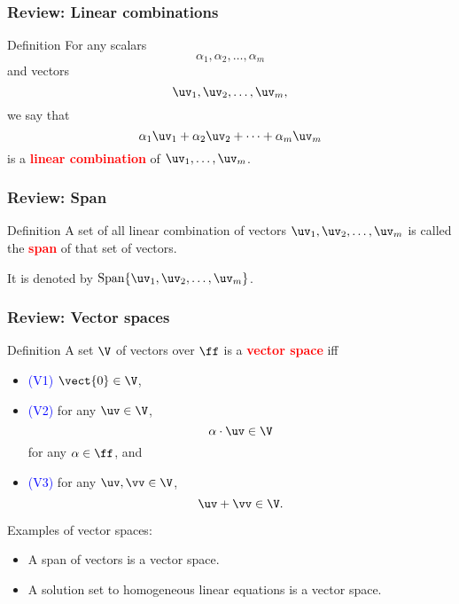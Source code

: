 

\begin{frame}
  \frametitle{Review: Linear combinations}

  \begin{block}{Definition}
    For any scalars
    \[
    \alpha_1,\alpha_2,\ldots,\alpha_m
    \]
    and vectors
    \[
    \uv_1,\uv_2,\ldots,\uv_m,
    \]
    we say that
    \[
    \alpha_1\uv_1 + \alpha_2\uv_2 + \cdots + \alpha_m \uv_m
    \]
    is a \textcolor{red}{\bf linear combination} of $\uv_1,\ldots,\uv_m$.
  \end{block}
\end{frame}

\begin{frame}
  \frametitle{Review: Span}

  \begin{block}{Definition}
    A set of all linear combination of vectors $\uv_1,\uv_2,\ldots,\uv_m$ is called the \textcolor{red}{\bf span} of that set of vectors.

    It is denoted by $\mathrm{Span} \{\uv_1,\uv_2,\ldots,\uv_m\}$.
  \end{block}
\end{frame}

\begin{frame}
  \frametitle{Review: Vector spaces}
  \begin{block}{Definition}
    A set $\V$ of vectors over $\ff$ is a \textcolor{red}{\bf vector space} iff
    \begin{itemize}
    \item \textcolor{blue}{(V1)} $\vect{0}\in\V$,
    \item \textcolor{blue}{(V2)} for any $\uv\in\V$,
      \[
      \alpha\cdot\uv\in\V
      \]
      for any
      $\alpha\in\ff$, and
    \item \textcolor{blue}{(V3)} for any $\uv,\vv\in\V$,
      \[
      \uv+\vv\in\V.
      \]
    \end{itemize}
  \end{block}

  Examples of vector spaces:
  \begin{itemize}
  \item A span of vectors is a vector space.
  \item A solution set to homogeneous linear equations is a vector space.
  \end{itemize}
\end{frame}

